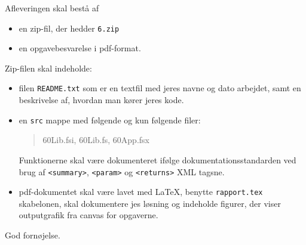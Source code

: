 \documentclass[a4paper,12pt]{article}
\newcommand{\exerciseNumber}{6}
\begin{document}
Afleveringen skal bestå af
\begin{itemize}
  \item en zip-fil, der hedder \texttt{\exerciseNumber\typeLetter.zip}
  \item en opgavebesvarelse i pdf-format.
\end{itemize}
Zip-filen skal indeholde:
\begin{itemize}
\item filen \texttt{README.txt} som er en textfil med jeres navne og dato arbejdet, samt en beskrivelse af, hvordan man kører jeres kode.
\item en \texttt{src} mappe med følgende og kun
  følgende filer:
  \begin{quote}
    \exerciseNumber\typeLetter0Lib.fsi, \exerciseNumber\typeLetter0Lib.fs, \exerciseNumber\typeLetter0App.fsx
  \end{quote}
  Funktionerne skal være dokumenteret ifølge dokumentationsstandarden ved brug af \verb|<summary>|, \verb|<param>| og \verb|<returns>| XML tagsne.
  \item pdf-dokumentet skal være lavet med \LaTeX, benytte \lstinline[language=console]{rapport.tex} skabelonen, skal dokumentere jes løsning og indeholde figurer, der viser outputgrafik fra canvas for opgaverne.
\end{itemize}

\flushright God fornøjelse.
\end{document}
